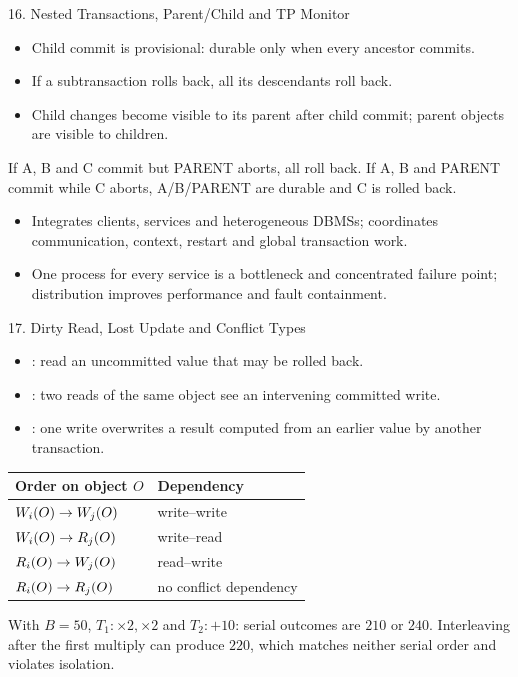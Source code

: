 \begin{topic}{16. Nested Transactions, Parent/Child and TP Monitor}
\begin{itemize}
  \item Child commit is provisional: durable only when every ancestor commits.
  \item If a subtransaction rolls back, all its descendants roll back.
  \item Child changes become visible to its parent after child commit; parent objects are visible to children.
\end{itemize}
\worked If A, B and C commit but PARENT aborts, all roll back. If A, B and PARENT commit while C aborts, A/B/PARENT are durable and C is rolled back.
\begin{itemize}
  \item Integrates clients, services and heterogeneous DBMSs; coordinates communication, context, restart and global transaction work.
  \item One process for every service is a bottleneck and concentrated failure point; distribution improves performance and fault containment.
\end{itemize}
\end{topic}

\begin{topic}{17. Dirty Read, Lost Update and Conflict Types}
\begin{itemize}
  \item {}: read an uncommitted value that may be rolled back.
  \item {}: two reads of the same object see an intervening committed write.
  \item {}: one write overwrites a result computed from an earlier value by another transaction.
\end{itemize}
\begin{tabularx}{\linewidth}{@{}lY@{}}
\toprule
Order on object \(O\) & Dependency\\
\midrule
\(W_i(O)\rightarrow W_j(O)\) & write--write\\
\(W_i(O)\rightarrow R_j(O)\) & write--read\\
\(R_i(O)\rightarrow W_j(O)\) & read--write\\
\(R_i(O)\rightarrow R_j(O)\) & no conflict dependency\\
\bottomrule
\end{tabularx}
\worked With \(B=50\), \(T_1:\times2,\times2\) and \(T_2:+10\): serial outcomes are \(210\) or \(240\). Interleaving after the first multiply can produce \(220\), which matches neither serial order and violates isolation.
\end{topic}

